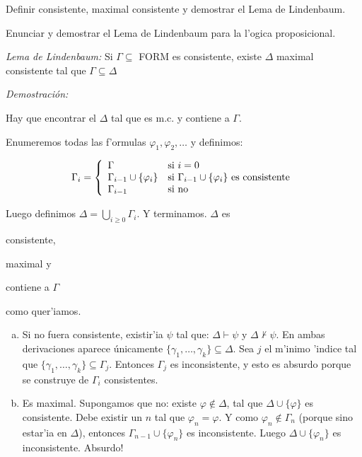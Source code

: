 \begin{questions}
\begin{solution}
\begin{enumerate}[a)]
 \end{enumerate}

\end{solution}

\question Definir consistente, maximal consistente y demostrar el Lema de Lindenbaum. 


\question Enunciar y demostrar el Lema de Lindenbaum para la l'ogica proposicional.


\begin{solution}

{\it Lema de Lindenbaum:} Si $\Gamma \subseteq$ FORM es consistente, existe $\Delta$ maximal consistente tal que $\Gamma \subseteq \Delta$

{\it Demostraci\'on: }

Hay que encontrar el $\Delta$ tal que es m.c. y contiene a $\Gamma$. 

Enumeremos todas las f'ormulas $\varphi_1, \varphi_2, \dots$ y definimos: 

$$\Gamma_i = \left\{
  \begin{array}{l l}
  \Gamma 				& \text{si } i = 0 \\
  \Gamma_{i-1} \cup \{ \varphi_i \} 	& \text{si } \Gamma_{i-1} \cup \{ \varphi_i \} \text{ es consistente} \\ 
  \Gamma_{i-1} 				& \text{si no} 
  \end{array}
  \right.
  $$

Luego definimos $\Delta = \bigcup_{i\geq 0} \Gamma_i$. Y terminamos. $\Delta$ es \begin{inparaenum}[(a)] \item consistente, \item maximal y \item contiene a $\Gamma$ \end{inparaenum} como quer'iamos.

\begin{enumerate}[(a)]
 \item Si no fuera consistente, existir'ia $\psi$ tal que: $\Delta \vdash \psi$ y $\Delta \nvdash \psi$. En ambas derivaciones aparece \'unicamente $\{ \gamma_1, \dots, \gamma_k \} \subseteq \Delta$. Sea $j$ el m'inimo 'indice tal que $\{ \gamma_1, \dots, \gamma_k \} \subseteq \Gamma_j$. Entonces $\Gamma_j$ es inconsistente, y esto es absurdo porque se construye de $\Gamma_i$ consistentes. 
 
 \item Es maximal. Supongamos que no: existe $\varphi \notin \Delta$, tal que $\Delta\cup\{\varphi\}$ es consistente. Debe existir un $n$ tal que $\varphi_n = \varphi$. Y como $\varphi_n \notin \Gamma_n$ (porque sino estar'ia en $\Delta$), entonces $\Gamma_{n-1} \cup \{ \varphi_n \}$ es inconsistente. Luego $\Delta \cup \{ \varphi_n \}$ es inconsistente. Absurdo! 
 

\end{enumerate}
\end{solution}
\end{questions}
